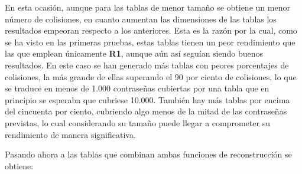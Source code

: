 \documentclass[12pt,spanish,listoffigures,listoftables,listofalgorithms]{tfgetsinf}
\begin{document}
En esta ocasión, aunque para las tablas de menor tamaño se obtiene un menor número de colisiones, en cuanto aumentan las dimensiones de las tablas los resultados empeoran respecto a los anteriores. Esta es la razón por la cual, como se ha visto en las primeras pruebas, estas tablas tienen un peor rendimiento que las que emplean únicamente \textbf{R1}, aunque aún así seguían siendo buenos resultados. En este caso se han generado más tablas con peores porcentajes de colisiones, la más grande de ellas superando el 90 por ciento de colisiones, lo que se traduce en menos de 1.000 contraseñas cubiertas por una tabla que en principio se esperaba que cubriese 10.000. También hay más tablas por encima del cincuenta por ciento, cubriendo algo menos de la mitad de las contraseñas previstas, lo cual considerando su tamaño puede llegar a comprometer su rendimiento de manera significativa.

Pasando ahora a las tablas que combinan ambas funciones de reconstrucción se obtiene:
\end{document}
